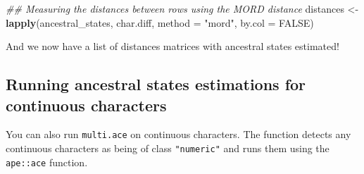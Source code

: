 \documentclass[
]{book}
\newenvironment{Shaded}{\begin{snugshade}}{\end{snugshade}}
\newcommand{\CommentTok}[1]{\textcolor[rgb]{0.56,0.35,0.01}{\textit{#1}}}
\newcommand{\DataTypeTok}[1]{\textcolor[rgb]{0.13,0.29,0.53}{#1}}
\newcommand{\DecValTok}[1]{\textcolor[rgb]{0.00,0.00,0.81}{#1}}
\newcommand{\KeywordTok}[1]{\textcolor[rgb]{0.13,0.29,0.53}{\textbf{#1}}}
\newcommand{\NormalTok}[1]{#1}
\newcommand{\OperatorTok}[1]{\textcolor[rgb]{0.81,0.36,0.00}{\textbf{#1}}}
\newcommand{\OtherTok}[1]{\textcolor[rgb]{0.56,0.35,0.01}{#1}}
\newcommand{\StringTok}[1]{\textcolor[rgb]{0.31,0.60,0.02}{#1}}
\begin{document}
\begin{Shaded}
\begin{Highlighting}[]
\CommentTok{\#\# Measuring the distances between rows using the MORD distance}
\NormalTok{distances \textless{}{-}}\StringTok{ }\KeywordTok{lapply}\NormalTok{(ancestral\_states, char.diff, }\DataTypeTok{method =} \StringTok{"mord"}\NormalTok{, }\DataTypeTok{by.col =} \OtherTok{FALSE}\NormalTok{)}
\end{Highlighting}
\end{Shaded}

And we now have a list of distances matrices with ancestral states estimated!

\hypertarget{running-ancestral-states-estimations-for-continuous-characters}{%
\subsection{Running ancestral states estimations for continuous characters}\label{running-ancestral-states-estimations-for-continuous-characters}}

You can also run \texttt{multi.ace} on continuous characters.
The function detects any continuous characters as being of class \texttt{"numeric"} and runs them using the \texttt{ape::ace} function.

\begin{Shaded}
\end{Shaded}
\end{document}
